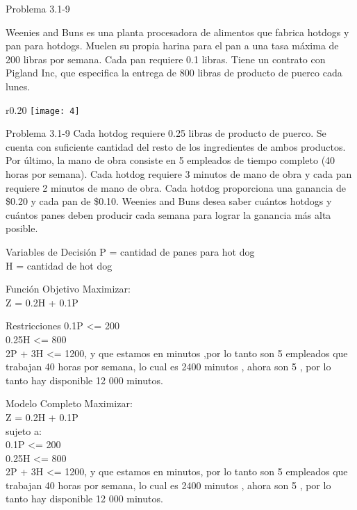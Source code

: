 \documentclass{beamer}
\begin{document}
\begin{frame}[t,fragile]{Problema  3.1-9}

Weenies and Buns es una planta procesadora de alimentos que fabrica hotdogs y pan para hotdogs. Muelen su propia harina para el pan a una tasa máxima de 200 libras por semana. Cada pan requiere 0.1 libras. Tiene un contrato con Pigland Inc, que especifica la entrega de 800 libras de producto de puerco cada lunes.
\begin{wrapfigure}{r}{0.20\textwidth}
    \centering
    \texttt{[image: 4]}
\end{wrapfigure}
\end{frame}
\begin{frame}[t,fragile]{Problema  3.1-9}
Cada hotdog requiere 0.25 libras de producto de puerco. Se cuenta con suficiente cantidad del resto de los ingredientes de ambos productos. Por último, la mano de obra consiste en 5 empleados de tiempo completo (40 horas por semana). Cada hotdog requiere 3 minutos de mano de obra y cada pan requiere 2 minutos de mano de obra. Cada hotdog proporciona una ganancia de \$0.20 y cada pan de \$0.10. Weenies and Buns desea saber cuántos hotdogs y cuántos panes deben producir cada semana para lograr la ganancia más alta posible.
\end{frame}
\begin{frame}[fragile]{Variables de Decisión}
P = cantidad de panes para hot dog\\
H = cantidad de hot dog

\end{frame}

\begin{frame}[fragile]{Función Objetivo}
Maximizar:\\
Z = 0.2H + 0.1P

\end{frame}

\begin{frame}[fragile]{Restricciones}
0.1P <= 200\\
0.25H <= 800\\
2P + 3H <= 1200, y que estamos en minutos ,por lo tanto son 5 empleados que trabajan 40 horas por semana, lo cual es 2400 minutos , ahora son 5 , por lo tanto hay disponible 12 000 minutos.

\end{frame}

\begin{frame}[fragile]{Modelo Completo}
Maximizar:\\
Z = 0.2H + 0.1P\\
sujeto a:\\
0.1P <= 200\\
0.25H <= 800\\
2P + 3H <= 1200, y que estamos en minutos, por lo tanto son 5 empleados que trabajan 40 horas por semana, lo cual es 2400 minutos , ahora son 5 , por lo tanto hay disponible 12 000 minutos.
\end{frame}
\end{document}
